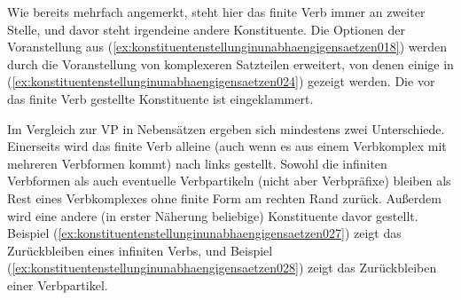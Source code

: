 \begin{exe}
  \ex\label{ex:konstituentenstellunginunabhaengigensaetzen018}
  \begin{xlist}
  \end{xlist}
\end{exe}

Wie bereits mehrfach angemerkt, steht hier das finite Verb immer an zweiter Stelle, und davor steht irgendeine andere Konstituente.
Die Optionen der Voranstellung aus (\ref{ex:konstituentenstellunginunabhaengigensaetzen018}) werden durch die Voranstellung von komplexeren Satzteilen erweitert, von denen einige in (\ref{ex:konstituentenstellunginunabhaengigensaetzen024}) gezeigt werden.
Die vor das finite Verb gestellte Konstituente ist eingeklammert.

\begin{exe}
  \ex\label{ex:konstituentenstellunginunabhaengigensaetzen024}
  \begin{xlist}
  \end{xlist}
\end{exe}

Im Vergleich zur VP in Nebensätzen ergeben sich mindestens zwei Unterschiede.
Einerseits wird das finite Verb alleine (auch wenn es aus einem Verbkomplex mit mehreren Verbformen kommt) nach links gestellt.
Sowohl die infiniten Verbformen als auch eventuelle Verbpartikeln (nicht aber Verbpräfixe) bleiben als Rest eines Verbkomplexes ohne finite Form am rechten Rand zurück.
Außerdem wird eine andere (in erster Näherung beliebige) Konstituente davor gestellt.
Beispiel (\ref{ex:konstituentenstellunginunabhaengigensaetzen027}) zeigt das Zurückbleiben eines infiniten Verbs, und Beispiel (\ref{ex:konstituentenstellunginunabhaengigensaetzen028}) zeigt das Zurückbleiben einer Verbpartikel.


